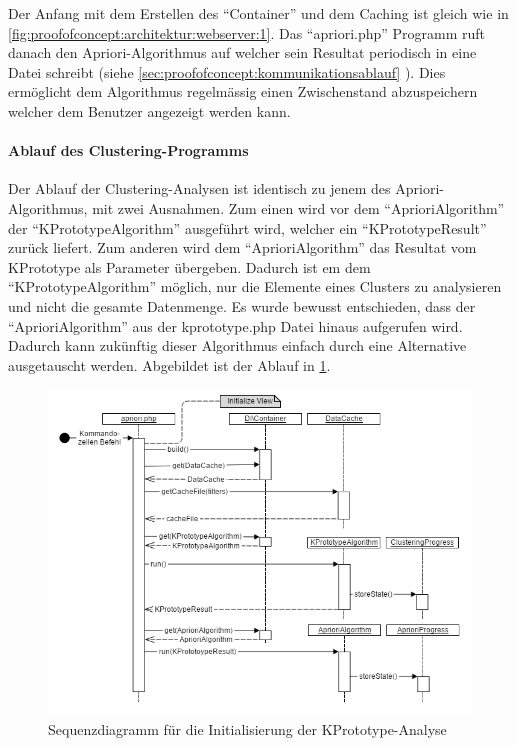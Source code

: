 Der Anfang mit dem Erstellen des "`Container"' und dem Caching ist gleich wie in \cref{fig:proofofconcept:architektur:webserver:1}. Das "`apriori.php"' Programm ruft danach den Apriori-Algorithmus auf welcher sein Resultat periodisch in eine Datei schreibt (siehe \cref{sec:proofofconcept:kommunikationsablauf} ). Dies ermöglicht dem Algorithmus regelmässig einen Zwischenstand abzuspeichern welcher dem Benutzer angezeigt werden kann.

\paragraph{Ablauf des Clustering-Programms}
Der Ablauf der Clustering-Analysen ist identisch zu jenem des Apriori-Algorithmus, mit zwei Ausnahmen. Zum einen wird vor dem "`AprioriAlgorithm"' der "`KPrototypeAlgorithm"' ausgeführt wird, welcher ein "`KPrototypeResult"' zurück liefert. 
Zum anderen wird dem "`AprioriAlgorithm"' das Resultat vom KPrototype als Parameter übergeben. Dadurch ist em dem "`KPrototypeAlgorithm"' möglich, nur die Elemente eines Clusters zu analysieren und nicht die gesamte Datenmenge. 
Es wurde bewusst entschieden, dass der "`AprioriAlgorithm"' aus der kprototype.php Datei hinaus aufgerufen wird. Dadurch kann zukünftig dieser Algorithmus einfach durch eine Alternative ausgetauscht werden.
Abgebildet ist der Ablauf in \cref{fig:proofofconcept:architektur:hintergrundprozesser:2}. 
\begin{figure}[H]
	\centering
	\includegraphics[width=1\textwidth]{images/diagram-sequence-kprototype}
	\caption{Sequenzdiagramm für die Initialisierung der KPrototype-Analyse}
	\label{fig:proofofconcept:architektur:hintergrundprozesser:2}
\end{figure}

